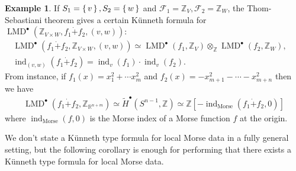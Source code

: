 \documentclass[a4paper,dvipdfmx,reqno,12pt]{amsart}
\theoremstyle{definition}
\newtheorem{example}[theorem]{Example}
\newcommand{\Z}{\mathbb{Z}}%
\newcommand{\mcal}[1]{\mathcal{#1}}%
\newcommand{\opn}[1]{\operatorname{#1}}
\numberwithin{equation}{section}
\begin{document}
\begin{example}
  If $S_1=\set{v},S_2=\set{w}$ and $\mcal{F}_1=\Z_V, \mcal{F}_2=\Z_{W}$,
  the Thom-Sebastiani theorem gives
  a certain K\"unneth formula for
  $\opn{LMD}^{\bullet}(\Z_{V\times W},f_1\dot{+}f_2,(v,w))$:
\begin{align}
\opn{LMD}^{\bullet}(f_1\dot{+}f_2,\Z_{V\times W},(v,w))
\simeq \opn{LMD}^{\bullet}(f_1,\Z_{V})
\otimes_{\Z} \opn{LMD}^{\bullet}(f_2,\Z_{W}), \quad \\
\opn{ind}_{(v,w)}(f_1\dot{+}f_2)=\opn{ind}_v(f_1)\cdot \opn{ind}_v(f_2).
\end{align}
  From instance, if $f_1(x)=x_1^{2}+\cdots x_{m}^{2}$
  and $f_2(x)=-x_{m+1}^{2}-\cdots - x_{m+n}^{2}$ then we have
\begin{align}
    \opn{LMD}^{\bullet}(f_1\dot{+}f_2,\Z_{{\mathbb{R}}^{n+m}})
    \simeq \tilde{H}^{\bullet}(S^{n-1},\Z)
    \simeq \Z[-\opn{ind}_{\mathrm{Morse}}(f_1\dot{+}f_2,0)]
\end{align}
  where $\opn{ind}_{\mathrm{Morse}}(f,0)$ is the Morse index
  of a Morse function $f$ at the origin.
\end{example}

We don't state a K\"unneth type formula for 
local Morse data in a fully
general setting, but the following corollary 
is enough for performing that there exists 
a K\"unneth type formula for local Morse data.
\end{document}
